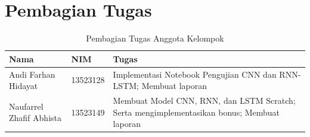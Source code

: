 
\chapter{Pembagian Tugas}

\begin{table}[H]
    \centering
    \caption{Pembagian Tugas Anggota Kelompok}
    \label{tab:pembagian-tugas}
    \begin{tabularx}{\textwidth}{l l X}
        \toprule
        \textbf{Nama} & \textbf{NIM} & \textbf{Tugas} \\
        \midrule
        Andi Farhan Hidayat & 13523128 & Implementasi Notebook Pengujian CNN dan RNN-LSTM; Membuat laporan  \\
        Naufarrel Zhafif Abhista & 13523149 & Membuat Model CNN, RNN, dan LSTM Scratch; Serta mengimplementasikan bonus; Membuat laporan \\
        \bottomrule
    \end{tabularx}
\end{table}

\noindent